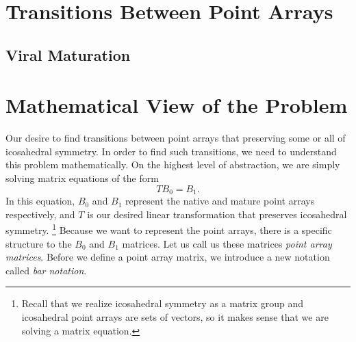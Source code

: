 \documentclass[a4paper,10pt]{article}
\let\oldfootnote\footnote
\renewcommand{\footnote}{\unskip\oldfootnote}
\theoremstyle{plain}
\theoremstyle{definition}
\theoremstyle{remark}
\renewcommand{\vec}[1]{\mathbf{#1}}
\begin{document}
\section{Transitions Between Point Arrays}
\subsection{Viral Maturation}

\section{Mathematical View of the Problem}
Our desire to find transitions between point arrays that preserving some or all of icosahedral symmetry.
In order to find such transitions, we need to understand this problem mathematically.
On the highest level of abstraction, we are simply solving matrix equations of the form \[TB_0 = B_1.\]
In this equation, \(B_0\) and \(B_1\) represent the native and mature point arrays respectively, and \(T\) is our desired linear transformation that preserves icosahedral symmetry.
\footnote{Recall that we realize icosahedral symmetry as a matrix group and icosahedral point arrays are sets of vectors, so it makes sense that we are solving a matrix equation.}
Because we want to represent the point arrays, there is a specific structure to the \( B_0 \) and \( B_1 \) matrices.
Let us call us these matrices \emph{point array matrices}.
Before we define a point array matrix, we introduce a new notation called \emph{bar notation}.
\newcommand{\icobar}[1]{\overline{\vec{#1}}}
\end{document}
